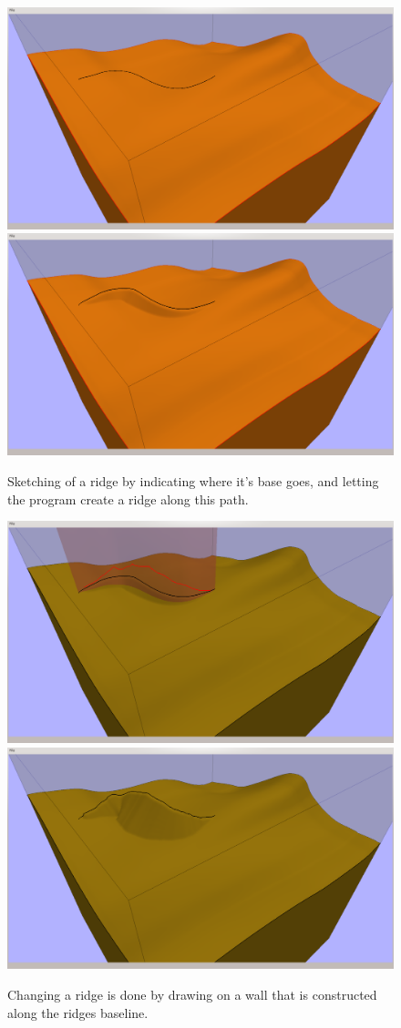 \documentclass[a4paper,12pt]{report}
\begin{document}
\begin{figure}
\includegraphics[trim = 30mm 80mm 120mm 30mm, clip,width=.5\linewidth]{thesis/results/ridgeDraw.png}
\includegraphics[trim = 30mm 80mm 120mm 30mm, clip,width=.5\linewidth]{thesis/results/ridgeDrawn.png}
 \caption{Sketching of a ridge by indicating where it's base goes, and letting the program create a ridge along this path. }
 \label{fig:ridgeDraw}
\end{figure}

\begin{figure}
\includegraphics[trim = 30mm 80mm 120mm 30mm, clip,width=.5\linewidth]{thesis/results/ridgeChange.png}
\includegraphics[trim = 30mm 80mm 120mm 30mm, clip,width=.5\linewidth]{thesis/results/ridgeChanged.png}
 \caption{Changing a ridge is done by drawing on a wall that is constructed along the ridges baseline. }
 \label{fig:ridgeChange}
\end{figure}
\end{document}
